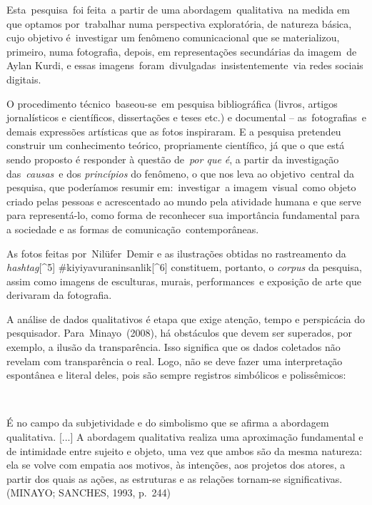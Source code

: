 \documentclass[
  letterpaper,
  a4paper,
  12pt]{scrbook}
\renewenvironment{quote}
  {\par\singlespacing\small\list{}{\rightmargin=0cm \leftmargin=4cm}%
   \item\relax}
  {\endlist}
\begin{document}
Esta~pesquisa~foi feita~a partir de uma abordagem~qualitativa~na medida
em que optamos por~trabalhar numa perspectiva exploratória, de natureza
básica, cujo objetivo é~investigar um fenômeno comunicacional que se
materializou, primeiro, numa fotografia, depois, em representações
secundárias da imagem~de Aylan Kurdi, e essas
imagens~foram~divulgadas~insistentemente~via redes sociais digitais.

O procedimento técnico~baseou-se~em pesquisa bibliográfica (livros,
artigos jornalísticos e científicos, dissertações e teses etc.) e
documental -- as~fotografias~e demais expressões artísticas que as fotos
inspiraram. E a pesquisa pretendeu construir um conhecimento teórico,
propriamente científico, já que o que está sendo proposto é responder à
questão de~\emph{por que é}, a partir da investigação
das~\emph{causas}~e dos \emph{princípios} do fenômeno, o que nos leva ao
objetivo~central da pesquisa, que poderíamos resumir em:~investigar~a
imagem~visual~como objeto criado pelas pessoas e acrescentado ao mundo
pela atividade humana e que serve para representá-lo, como forma de
reconhecer sua importância fundamental para a sociedade e as formas de
comunicação~contemporâneas.

As fotos feitas por~Nilüfer~Demir e as ilustrações obtidas no
rastreamento da \emph{hashtag}{[}\^{}5{]}
\#kiyiyavuraninsanlik{[}\^{}6{]} constituem, portanto, o \emph{corpus}
da pesquisa, assim como imagens de esculturas, murais, performances~e
exposição de arte que derivaram da fotografia.~

A análise de dados qualitativos é etapa que exige atenção, tempo e
perspicácia do pesquisador. Para~Minayo~(2008), há obstáculos que devem
ser superados, por exemplo, a ilusão da transparência. Isso significa
que os dados coletados não revelam com transparência o real. Logo, não
se deve fazer uma interpretação espontânea e literal deles, pois são
sempre registros simbólicos e polissêmicos:~

~

\begin{quote}
É no campo da subjetividade e do simbolismo que se afirma a abordagem
qualitativa. {[}...{]} A abordagem qualitativa realiza uma aproximação
fundamental e de intimidade entre sujeito e objeto, uma vez que ambos
são da mesma natureza: ela se volve com empatia aos motivos, às
intenções, aos projetos dos atores, a partir dos quais as ações, as
estruturas e as relações tornam-se significativas. (MINAYO; SANCHES,
1993, p.~244)~
\end{quote}
\end{document}
